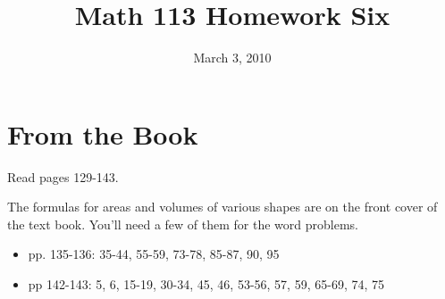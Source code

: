 \documentclass[fleqn,addpoints]{exam}
\title{Math 113 Homework Six}
\author{}
\date{March 3, 2010}
\begin{document}
\maketitle

\section{From the Book}

Read pages 129-143.

The formulas for areas and volumes of various shapes are on the front cover of the text book.  You'll need a few of them
for the word problems.

\begin{itemize}
  \item pp. 135-136: 35-44, 55-59, 73-78, 85-87, 90, 95
  \item pp 142-143: 5, 6, 15-19, 30-34, 45, 46, 53-56, 57, 59, 65-69, 74, 75
\end{itemize}
\end{document}
